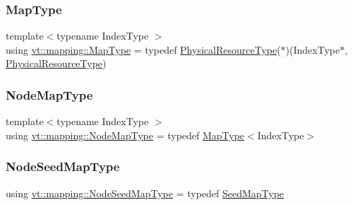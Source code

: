 \mbox{\label{namespacevt_1_1mapping_a443f8bb8920af5ae1d3391f61fe492a6}} 
\subsubsection{\texorpdfstring{Map\+Type}{MapType}}
{\footnotesize\ttfamily template$<$typename Index\+Type $>$ \\
using \hyperlink{namespacevt_1_1mapping_a443f8bb8920af5ae1d3391f61fe492a6}{vt\+::mapping\+::\+Map\+Type} = typedef \hyperlink{namespacevt_a2dc36fcada816dc6d11774d650328ee9}{Physical\+Resource\+Type}($\ast$)(Index\+Type$\ast$, \hyperlink{namespacevt_a2dc36fcada816dc6d11774d650328ee9}{Physical\+Resource\+Type})}

\mbox{\label{namespacevt_1_1mapping_a8dbe779cb3e28ed8c424bcc8826765b9}} 
\subsubsection{\texorpdfstring{Node\+Map\+Type}{NodeMapType}}
{\footnotesize\ttfamily template$<$typename Index\+Type $>$ \\
using \hyperlink{namespacevt_1_1mapping_a8dbe779cb3e28ed8c424bcc8826765b9}{vt\+::mapping\+::\+Node\+Map\+Type} = typedef \hyperlink{namespacevt_1_1mapping_a443f8bb8920af5ae1d3391f61fe492a6}{Map\+Type}$<$Index\+Type$>$}

\mbox{\label{namespacevt_1_1mapping_a84d654b657f2dbe639ada06ae688e4c7}} 
\subsubsection{\texorpdfstring{Node\+Seed\+Map\+Type}{NodeSeedMapType}}
{\footnotesize\ttfamily using \hyperlink{namespacevt_1_1mapping_a84d654b657f2dbe639ada06ae688e4c7}{vt\+::mapping\+::\+Node\+Seed\+Map\+Type} = typedef \hyperlink{namespacevt_1_1mapping_a1c1409d9af8d1ac402af022a65be4a4d}{Seed\+Map\+Type}}

